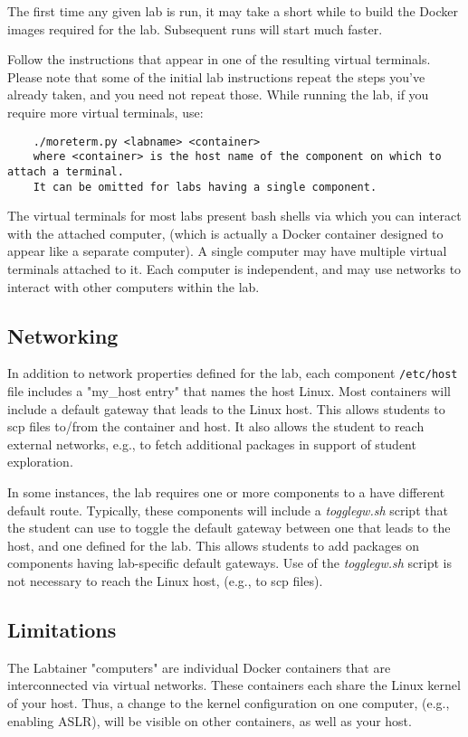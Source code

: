 \documentclass[12pt]{article}
\begin{document}
The first time any given lab is run, it may take a short while to build the Docker images 
required for the lab.  Subsequent runs will start much faster.

Follow the instructions that appear in one of the resulting virtual terminals.  Please
note that some of the initial lab instructions repeat the steps you've already taken, and you need
not repeat those.  While running the lab, if you require more virtual terminals, use:
\begin{verbatim}
    ./moreterm.py <labname> <container>
    where <container> is the host name of the component on which to attach a terminal.  
    It can be omitted for labs having a single component.
\end{verbatim}

The virtual terminals for most labs present bash shells via which you can interact
with the attached computer, (which is actually a Docker container designed to appear
like a separate computer).  A single computer
may have multiple virtual terminals attached to it.  Each computer is independent, and 
may use networks to interact with other computers within the lab.  

\subsection{Networking}
In addition to network properties defined for the lab,
each component \texttt{/etc/host} file includes a "my\_host entry" that names
the host Linux.  Most containers will include a default gateway that
leads to the Linux host.  This allows students to scp files to/from the container and host.
It also allows the student to reach external networks, e.g., to fetch additional packages in
support of student exploration.

In some instances, the lab requires one or more components to a have different default route.
Typically, these components will include a \textit{togglegw.sh} script that the student
can use to toggle the default gateway between one that leads to the host, and one defined for the lab.
This allows students to add packages on components having lab-specific default gateways.
Use of the \textit{togglegw.sh} script is not necessary to reach the Linux host, (e.g., to scp files).

\subsection{Limitations}
The Labtainer "computers" are individual Docker containers that are interconnected via virtual
networks.  These containers each share the Linux kernel of your host.  Thus, a change
to the kernel configuration on one computer, (e.g., enabling ASLR), will be visible on
other containers, as well as your host.
\end{document}

